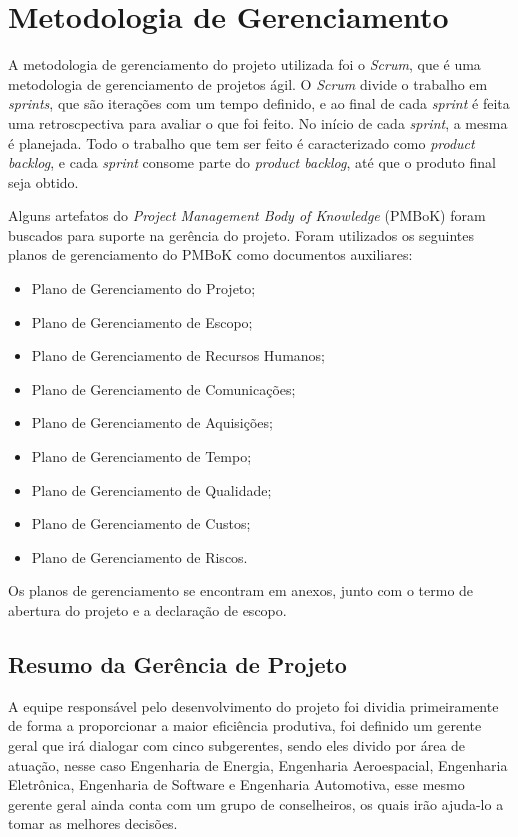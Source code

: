  
\section{Metodologia de Gerenciamento}

A metodologia de gerenciamento do projeto utilizada foi o \textit{Scrum}, que é uma metodologia de gerenciamento de projetos ágil.
O \textit{Scrum} divide o trabalho em \textit{sprints}, que são iterações com um tempo definido, e ao final de cada 
\textit{sprint} é feita uma retroscpectiva para avaliar o que foi feito. No início de cada \textit{sprint},
a mesma é planejada. Todo o trabalho que tem ser feito é caracterizado como \textit{product backlog}, e cada \textit{sprint}
consome parte do \textit{product backlog}, até que o produto final seja obtido.

Alguns artefatos do \textit{Project Management Body of Knowledge} (PMBoK) foram buscados para suporte na gerência do projeto.
Foram utilizados os seguintes planos de gerenciamento do PMBoK como documentos auxiliares:

  \begin{itemize}
  \item Plano de Gerenciamento do Projeto;
  \item Plano de Gerenciamento de Escopo;
  \item Plano de Gerenciamento de Recursos Humanos;
  \item Plano de Gerenciamento de Comunicações;
  \item Plano de Gerenciamento de Aquisições;
  \item Plano de Gerenciamento de Tempo;
  \item Plano de Gerenciamento de Qualidade;
  \item Plano de Gerenciamento de Custos;
  \item Plano de Gerenciamento de Riscos.
  \end{itemize}
  
  Os planos de gerenciamento se encontram em anexos, junto com o termo de abertura do projeto e a declaração de escopo.
  
  \subsection{Resumo da Gerência de Projeto}
    A equipe responsável pelo desenvolvimento do projeto foi dividia primeiramente de forma a proporcionar a maior
    eficiência produtiva, foi definido um gerente geral que irá dialogar com cinco subgerentes, sendo eles divido por
    área de atuação, nesse caso Engenharia de Energia, Engenharia Aeroespacial, Engenharia Eletrônica, Engenharia de Software
    e Engenharia Automotiva, esse mesmo gerente geral ainda conta com um grupo de conselheiros, os quais irão ajuda-lo
    a tomar as melhores decisões.

